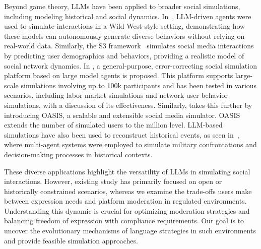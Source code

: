 Beyond game theory, LLMs have been applied to broader social simulations, including modeling historical and social dynamics. In~\cite{Park2023GenerativeAI}, LLM-driven agents were used to simulate interactions in a Wild West-style setting, demonstrating how these models can autonomously generate diverse behaviors without relying on real-world data. Similarly, the S3 framework~\cite{gao2023s3} simulates social media interactions by predicting user demographics and behaviors, providing a realistic model of social network dynamics. 
In \cite{tang2024gensim}, a general-purpose, error-correcting social simulation platform based on large model agents is proposed. This platform supports large-scale simulations involving up to 100k participants and has been tested in various scenarios, including labor market simulations and network user behavior simulations, with a discussion of its effectiveness.
Similarly, \cite{yang2024oasis} takes this further by introducing OASIS, a scalable and extensible social media simulator. OASIS extends the number of simulated users to the million level.
LLM-based simulations have also been used to reconstruct historical events, as seen in~\cite{hua2023war}, where multi-agent systems were employed to simulate military confrontations and decision-making processes in historical contexts.

These diverse applications highlight the versatility of LLMs in simulating social interactions. However, existing study has primarily focused on open or historically constrained scenarios, whereas we examine the trade-offs users make between expression needs and platform moderation in regulated environments. Understanding this dynamic is crucial for optimizing moderation strategies and balancing freedom of expression with compliance requirements. Our goal is to uncover the evolutionary mechanisms of language strategies in such environments and provide feasible simulation approaches.



